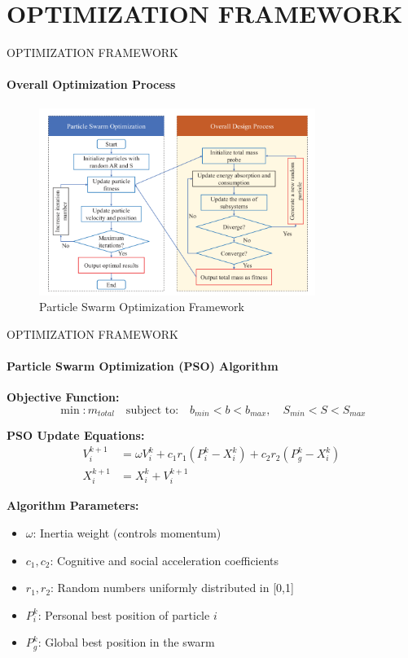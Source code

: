 \documentclass{beamer}
\begin{document}
\section{OPTIMIZATION FRAMEWORK}

\begin{frame}{OPTIMIZATION FRAMEWORK}
    \framesubtitle{Overall Optimization Process}
    \begin{figure}
        \centering
        \includegraphics[width=0.8\textwidth]{optimation_framework.png} %
        \caption{Particle Swarm Optimization Framework}
        \label{fig:optimization_framework}
    \end{figure}
\end{frame}

\begin{frame}{OPTIMIZATION FRAMEWORK}
    \framesubtitle{Particle Swarm Optimization (PSO) Algorithm}
    
    \textbf{Objective Function:}
    \begin{equation*}
        \min: m_{total} \quad \text{subject to:} \quad b_{min} < b < b_{max}, \quad S_{min} < S < S_{max}
    \end{equation*}
    
    \textbf{PSO Update Equations:}
    \begin{align*}
        V_i^{k+1} &= \omega V_i^k + c_1 r_1 (P_i^k - X_i^k) + c_2 r_2 (P_g^k - X_i^k) \\
        X_i^{k+1} &= X_i^k + V_i^{k+1}
    \end{align*}
    
    \textbf{Algorithm Parameters:}
    \begin{itemize}
        \item $\omega$: Inertia weight (controls momentum)
        \item $c_1, c_2$: Cognitive and social acceleration coefficients
        \item $r_1, r_2$: Random numbers uniformly distributed in [0,1]
        \item $P_i^k$: Personal best position of particle $i$
        \item $P_g^k$: Global best position in the swarm
    \end{itemize}
\end{frame}
\end{document}
